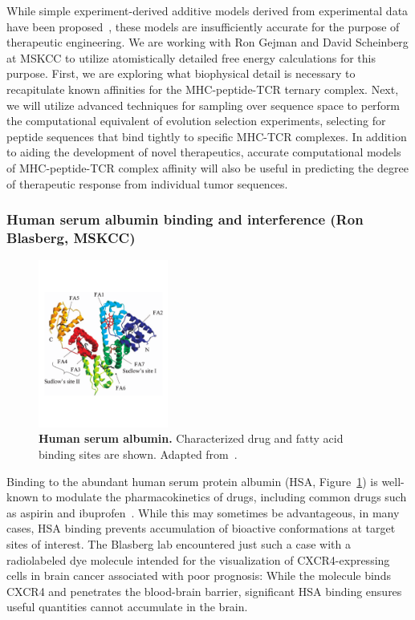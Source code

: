 \documentclass[10pt]{article}
\begin{document}
While simple experiment-derived additive models derived from experimental data have been proposed~\cite{Birnbaum:2014:Cell}, these models are insufficiently accurate for the purpose of therapeutic engineering.
We are working with Ron Gejman and David Scheinberg at MSKCC to utilize atomistically detailed free energy calculations for this purpose.
First, we are exploring what biophysical detail is necessary to recapitulate known affinities for the MHC-peptide-TCR ternary complex.
Next, we will utilize advanced techniques for sampling over sequence space to perform the computational equivalent of evolution selection experiments, selecting for peptide sequences that bind tightly to specific MHC-TCR complexes.
In addition to aiding the development of novel therapeutics, accurate computational models of MHC-peptide-TCR complex affinity will also be useful in predicting the degree of therapeutic response from individual tumor sequences.

\vspace{-0.5cm}
\subsubsection*{Human serum albumin binding and interference (Ron Blasberg, MSKCC)}
\vspace{-0.3cm}

\begin{figure}
\vspace{-2.3cm}
\includegraphics[width=0.38\textwidth]{figures/hsa-binding-sites.pdf}
\vspace{-2.2cm}
\caption{\footnotesize \label{figure:hsa} {\bf Human serum albumin.}
Characterized drug and fatty acid binding sites are shown.
Adapted from~\cite{fasano:iubmb-life:2005:hsa-review}.}
\end{figure}

Binding to the abundant human serum protein albumin (HSA, Figure~\ref{figure:hsa}) is well-known to modulate the pharmacokinetics of drugs, including common drugs such as aspirin and ibuprofen~\cite{fasano:iubmb-life:2005:hsa-review}.
While this may sometimes be advantageous, in many cases, HSA binding prevents accumulation of bioactive conformations at target sites of interest.
The Blasberg lab encountered just such a case with a radiolabeled dye molecule intended for the visualization of CXCR4-expressing cells in brain cancer associated with poor prognosis: While the molecule binds CXCR4 and penetrates the blood-brain barrier, significant HSA binding ensures useful quantities cannot accumulate in the brain.
\end{document}
